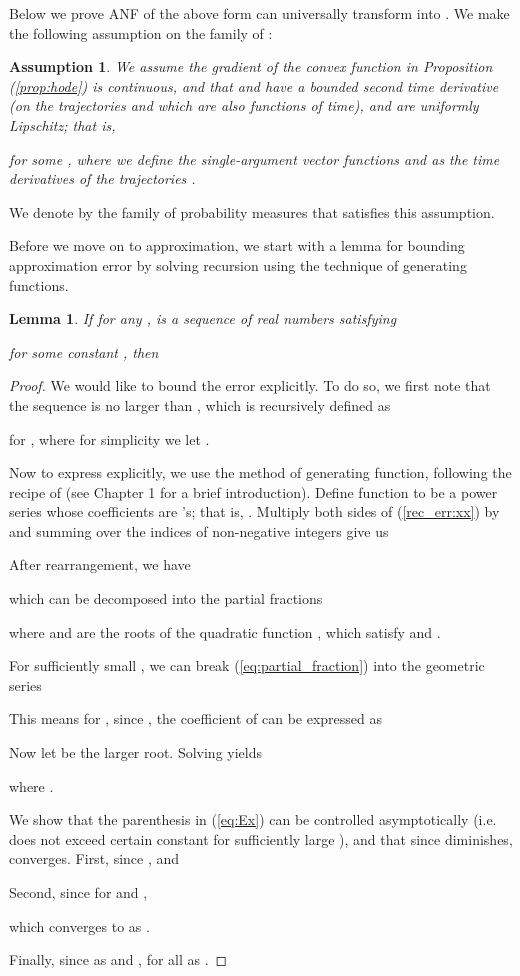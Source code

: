 \documentclass{article}
\newtheorem{lemma}{Lemma}
\newtheorem{assumption}{Assumption}
\begin{document}
Below we prove ANF of the above form can universally transform  into . 
We make the following assumption on the family of :
\begin{assumption}
\label{assumption}
We assume the gradient of the convex function in Proposition (\ref{prop:hode})  is continuous, and that
 and 
 have a bounded second time derivative (on the trajectories  and  which are also functions of time), and are uniformly Lipschitz; that is,

for some , where we define the single-argument vector functions  and  as the time derivatives of the trajectories . 
\end{assumption}

We denote by  the family of probability measures that satisfies this assumption. 

Before we move on to approximation, we start with a lemma for bounding approximation error by solving recursion using the technique of generating functions. 
\begin{lemma}
\label{lem:recursive_error}
If for any ,  is a sequence of real numbers satisfying

for some constant , then 
\end{lemma}
\begin{proof}
We would like to bound the error  explicitly.
To do so, we first note that the sequence  is no larger than , which is recursively defined as 

for ,
where for simplicity we let .

Now to express  explicitly, we use the method of generating function, following the recipe of \citet{wilf2005generatingfunctionology} (see Chapter 1 for a brief introduction). 
Define function  to be a power series whose coefficients are 's; that is, . 
Multiply both sides of (\ref{rec_err:xx}) by  and summing over the indices of non-negative integers  give us


After rearrangement, we have

which can be decomposed into the partial fractions

where  and  are the roots of the quadratic function ,
which satisfy  and . 

For sufficiently small , we can break (\ref{eq:partial_fraction}) into the geometric series


This means for , since , the coefficient of  can be expressed as 



Now let  be the larger root. 
Solving  yields 

where .

We show that the parenthesis in (\ref{eq:Ex}) can be controlled asymptotically (i.e. does not exceed certain constant for sufficiently large ), and that since  diminishes,  converges. 
First, since ,  and


Second, since  for  and ,

which converges to  as . 

Finally, since  as  and ,  for all  as . 
\end{proof}
\end{document}
